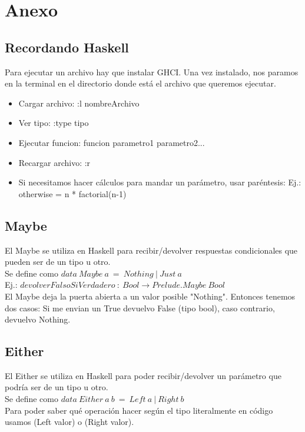 \documentclass[10pt,a4paper]{article}
\begin{document}
\section*{Anexo}
\subsection*{Recordando Haskell}
Para ejecutar un archivo hay que instalar GHCI. Una vez instalado, nos paramos en la terminal en el directorio donde está el archivo que queremos ejecutar. 
\begin{itemize}
    \item Cargar archivo: :l nombreArchivo
    \item Ver tipo: :type tipo 
    \item Ejecutar funcion: funcion parametro1 parametro2...
    \item Recargar archivo: :r
    \item Si necesitamos hacer cálculos para mandar un parámetro, usar paréntesis: Ej.: otherwise = n * factorial(n-1)
\end{itemize} 
\subsection*{Maybe}
El Maybe se utiliza en Haskell para recibir/devolver respuestas condicionales que pueden ser de un tipo u otro. \\

Se define como $data \ Maybe \ a \ = \ Nothing \ | \ Just \ a$ \\

Ej.: $ devolverFalsoSiVerdadero \:: \ Bool \rightarrow Prelude.Maybe \ Bool $ \\

El Maybe deja la puerta abierta a un valor posible "Nothing". Entonces tenemos dos casos: Si me envian un True devuelvo False (tipo bool), caso contrario, devuelvo Nothing. 

\subsection*{Either}
El Either se utiliza en Haskell para poder recibir/devolver un parámetro que podría ser de un tipo u otro. \\
Se define como $ data \ Either \ a \ b \ = \ Left \ a \ | \ Right \ b $ \\

Para poder saber qué operación hacer según el tipo literalmente en código usamos (Left valor) o (Right valor). \\
\end{document}

